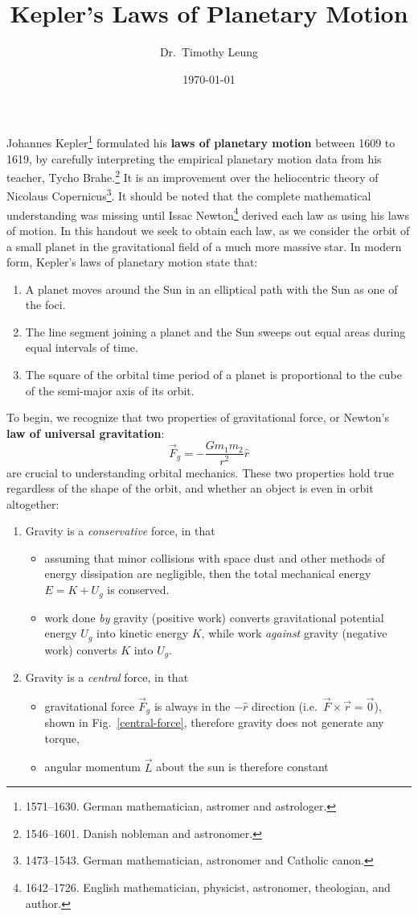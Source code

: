 \documentclass{../../oss-handout}
\title{Kepler's Laws of Planetary Motion}
\author{Dr.\ Timothy Leung}
\date{\today}
\begin{document}
\thispagestyle{title}
\gentitle

Johannes Kepler\footnote{1571--1630. German mathematician, astromer and
  astrologer.} formulated his \textbf{laws of planetary motion}
between 1609 to 1619, by carefully interpreting the empirical planetary motion
data from his teacher, Tycho Brahe.\footnote{1546--1601. Danish nobleman and
  astronomer.} It is an improvement over the heliocentric
theory of Nicolaus Copernicus\footnote{1473--1543. German mathematician,
  astronomer and Catholic canon.}. It should be noted that the complete
mathematical understanding was missing until Issac Newton\footnote{1642--1726.
  English mathematician, physicist, astronomer, theologian, and author.}
derived each law as using his laws of motion. In this handout we seek to obtain
each law, as we consider the orbit of a small planet in the gravitational field
of a much more massive star. In modern form, Kepler's laws of planetary motion
state that:
\begin{enumerate}[nosep]
\item A planet moves around the Sun in an elliptical path with the Sun as one
  of the foci.
\item The line segment joining a planet and the Sun sweeps out equal areas
  during equal intervals of time.
\item The square of the orbital time period of a planet is proportional to the
  cube of the semi-major axis of its orbit.
\end{enumerate}
To begin, we recognize that two properties of gravitational force, or Newton's
\textbf{law of universal gravitation}:
\begin{equation}
  \vec F_g=-\frac{Gm_1m_2}{r^2}\hat r
\end{equation}
are crucial to
understanding orbital mechanics. These two properties hold true regardless
of the shape of the orbit, and whether an object is even in orbit altogether:
\begin{enumerate}[topsep=0pt]
\item Gravity is a \emph{conservative} force, in that
  \begin{itemize}[nosep]
  \item assuming that minor collisions with space dust and other methods of
    energy dissipation are negligible, then the total mechanical energy
    $E=K+U_g$ is conserved.
  \item work done \emph{by} gravity (positive work) converts gravitational
    potential energy $U_g$ into kinetic energy $K$, while work \emph{against}
    gravity (negative work) converts $K$ into $U_g$.
  \end{itemize}
\item Gravity is a \emph{central} force, in that
  \begin{itemize}[nosep]
  \item gravitational force $\vec F_g$ is always in the $-\hat r$ direction
    (i.e.\ $\vec F\times\vec r=\vec 0$), shown in
    Fig.~\ref{central-force}, therefore gravity does not generate any torque,
  \item angular momentum $\vec L$ about the sun is therefore constant
  \end{itemize}
\end{enumerate}
\end{document}
